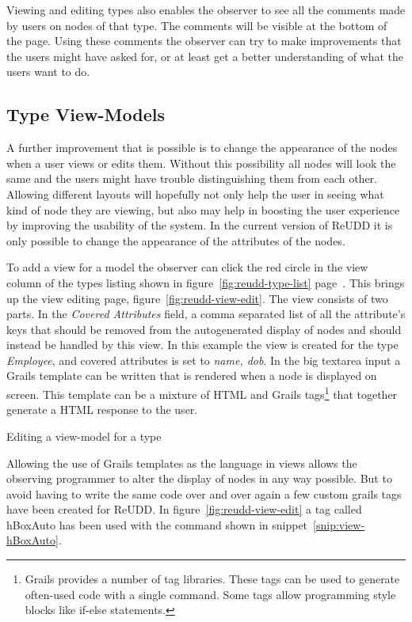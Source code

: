 \documentclass[a4paper]{report}
\begin{document}
Viewing and editing types also enables the observer to see all the comments made by users on nodes of that type. The comments will be visible at the bottom of the page. Using these comments the observer can try to make improvements that the users might have asked for, or at least get a better understanding of what the users want to do.

\subsection{Type View-Models} \label{sec:type-view-models}
A further improvement that is possible is to change the appearance of the nodes when a user views or edits them. Without this possibility all nodes will look the same and the users might have trouble distinguishing them from each other. Allowing different layouts will hopefully not only help the user in seeing what kind of node they are viewing, but also may help in boosting the user experience by improving the usability of the system. In the current version of ReUDD it is only possible to change the appearance of the attributes of the nodes.

To add a view for a model the observer can click the red circle in the view column of the types listing shown in figure~\ref{fig:reudd-type-list} page~\pageref{fig:reudd-type-list}. This brings up the view editing page, figure~\ref{fig:reudd-view-edit}. The view consists of two parts. In the \emph{Covered Attributes} field, a comma separated list of all the attribute's keys that should be removed from the autogenerated display of nodes and should instead be handled by this view. In this example the view is created for the type \emph{Employee}, and covered attributes is set to \emph{name, dob}. In the big textarea input a Grails template can be written that is rendered when a node is displayed on screen. This template can be a mixture of HTML and Grails tags\footnote{Grails provides a number of tag libraries. These tags can be used to generate often-used code with a single command. Some tags allow programming style blocks like if-else statements.} that together generate a HTML response to the user.

	{Editing a view-model for a type}

Allowing the use of Grails templates as the language in views allows the observing programmer to alter the display of nodes in any way possible. But to avoid having to write the same code over and over again a few custom grails tags have been created for ReUDD. In figure~\ref{fig:reudd-view-edit} a tag called hBoxAuto has been used with the command shown in snippet~\ref{snip:view-hBoxAuto}.
\end{document}
